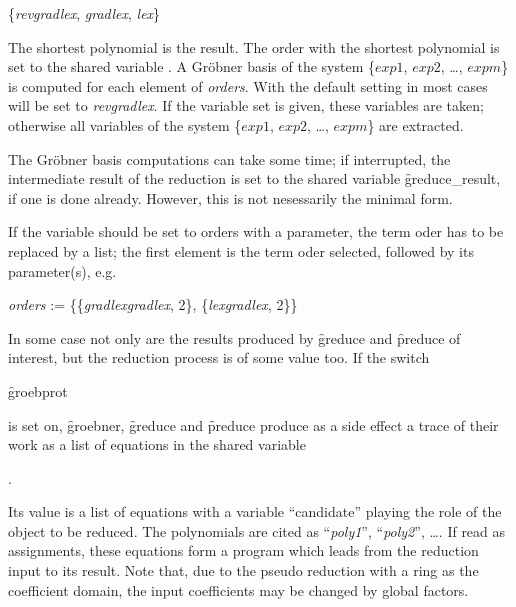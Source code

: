 \begin{center}
\{\emph{revgradlex}, \emph{gradlex}, \emph{lex}\}
\end{center}

The shortest polynomial is the result.
The order with the shortest polynomial is set to the shared variable
. A Gr\"obner basis of the system \{$exp1$, $exp2$, \ldots ,
$expm$\} is computed for each element of \emph{orders}.
With the default setting  in most cases will be set
to {\it revgradlex}.
If the variable set is given, these variables are taken; otherwise all
variables of the system \{$exp1$, $exp2$, \ldots , $expm$\} are
extracted.

\hypertarget{reserved:GREDUCE_RESULT}{}
The Gr\"obner basis computations can take some time; if interrupted, the
intermediate result of the reduction is set to the shared variable
\f{greduce\_result}, if one is done already. However, this is not
nesessarily the minimal form.

If the variable  should be set to orders with a parameter,
the term oder has to be replaced by a list; the first element is the
term oder selected, followed by its parameter(s), e.g.

\begin{center}
\emph{orders} := \{\{\emph{gradlexgradlex}, 2\}, \{\emph{lexgradlex}, 2\}\}
\end{center}

In some case not only are the results produced by \f{greduce} and
\f{preduce} of interest, but the reduction process is of some value
too. If the switch
\hypertarget{switch:GROEBPROT}{}
\begin{center}
\f{groebprot}
\end{center}
is set on, \f{groebner}, \f{greduce} and \f{preduce} produce as a side effect
a trace of their work as a \REDUCE list of equations in the shared variable
\hypertarget{reserved:GROEBPROTFILE}{}
\begin{center}
.
\end{center}
Its value is a list of equations with a variable ``candidate'' playing
the role of the object to be reduced. The polynomials are cited as
``\emph{poly1}'', ``\emph{poly2}'', \ldots\;. If read as assignments, these equations
form a program which leads from the reduction input to its result.
Note that, due to the pseudo reduction with a ring as the coefficient
domain, the input coefficients may be changed by global factors.

